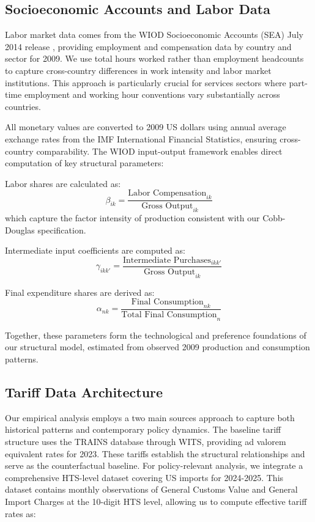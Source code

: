 

\subsection{Socioeconomic Accounts and Labor Data}

Labor market data comes from the WIOD Socioeconomic Accounts (SEA) July 2014 release \citep{timmer2015illustrated}, providing employment and compensation data by country and sector for 2009. We use total hours worked rather than employment headcounts to capture cross-country differences in work intensity and labor market institutions. This approach is particularly crucial for services sectors where part-time employment and working hour conventions vary substantially across countries.

All monetary values are converted to 2009 US dollars using annual average exchange rates from the IMF International Financial Statistics, ensuring cross-country comparability. The WIOD input-output framework enables direct computation of key structural parameters: 

Labor shares are calculated as:
\begin{equation}
\beta_{ik} = \frac{\text{Labor Compensation}_{ik}}{\text{Gross Output}_{ik}}
\end{equation}
which capture the factor intensity of production consistent with our Cobb-Douglas specification. 

Intermediate input coefficients are computed as:
\begin{equation}
\gamma_{ikk'} = \frac{\text{Intermediate Purchases}_{ikk'}}{\text{Gross Output}_{ik}}
\end{equation}

Final expenditure shares are derived as:
\begin{equation}
\alpha_{nk} = \frac{\text{Final Consumption}_{nk}}{\text{Total Final Consumption}_{n}}
\end{equation}

Together, these parameters form the technological and preference foundations of our structural model, estimated from observed 2009 production and consumption patterns.

\subsection{Tariff Data Architecture}

Our empirical analysis employs a two main sources approach to capture both historical patterns and contemporary policy dynamics. The baseline tariff structure uses the TRAINS database through WITS, providing ad valorem equivalent rates for 2023. These tariffs establish the structural relationships and serve as the counterfactual baseline.
For policy-relevant analysis, we integrate a comprehensive HTS-level dataset covering US imports for 2024-2025. This dataset contains monthly observations of General Customs Value and General Import Charges at the 10-digit HTS level, allowing us to compute effective tariff rates as:

